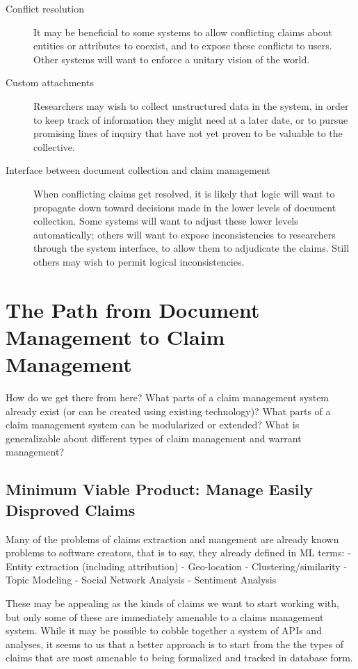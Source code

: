 \documentclass[format=siggraph, review=true]{acmart}
\begin{document}
\begin{description}
  \item [Conflict resolution] It may be beneficial to some systems to
    allow conflicting claims about entities or attributes to coexist,
    and to expose these conflicts to users. Other systems will want
    to enforce a unitary vision of the world.

  \item [Custom attachments] Researchers may wish to collect unstructured
    data in the system, in order to keep track of information they might
    need at a later date, or to pursue promising lines of inquiry that
    have not yet proven to be valuable to the collective.

  \item [Interface between document collection and claim management] When
    conflicting claims get resolved, it is likely that logic will
    want to propagate down toward decisions made in the lower levels
    of document collection. Some systems will want to adjust these lower
    levels automatically; others will want to expose inconsistencies to
    researchers through the system interface, to allow them to adjudicate
    the claims. Still others may wish to permit logical inconsistencies.
\end{description}

\section{The Path from Document Management to Claim Management}
How do we get there from here? What parts of a claim management system already exist (or can be created using existing technology)? What parts of a claim management system can be modularized or extended? What is generalizable about different types of claim management and warrant management? 

\subsection{Minimum Viable Product: Manage Easily Disproved Claims}
Many of the problems of claims extraction and mangement are already known problems to software creators, that is to say, they already defined in ML terms: 
- Entity extraction (including attribution)
- Geo-location
- Clustering/similarity
- Topic Modeling
- Social Network Analysis
- Sentiment Analysis

These may be appealing as the kinds of claims we want to start working with, but only some of these are immediately amenable to a claims management system. While it may be possible to cobble together a system of APIs and analyses, it seems to us that a better approach is to start from the the types of claims that are most amenable to being formalized and tracked in database form. 
\end{document}
